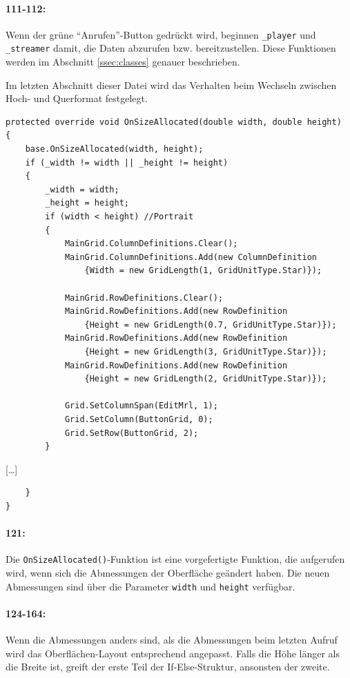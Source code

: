 \paragraph{111-112:} Wenn der grüne \enquote{Anrufen}-Button gedrückt wird, beginnen \texttt{\_player} und \texttt{\_streamer} damit, die Daten abzurufen bzw. bereitzustellen. Diese Funktionen werden im Abschnitt \ref{ssec:classes} genauer beschrieben.

Im letzten Abschnitt dieser Datei wird das Verhalten beim Wechseln zwischen Hoch- und Querformat festgelegt.
\begin{verbatim}
protected override void OnSizeAllocated(double width, double height)
{
    base.OnSizeAllocated(width, height);
    if (_width != width || _height != height)
    {
        _width = width;
        _height = height;
        if (width < height) //Portrait
        {
            MainGrid.ColumnDefinitions.Clear();
            MainGrid.ColumnDefinitions.Add(new ColumnDefinition
                {Width = new GridLength(1, GridUnitType.Star)});

            MainGrid.RowDefinitions.Clear();
            MainGrid.RowDefinitions.Add(new RowDefinition
                {Height = new GridLength(0.7, GridUnitType.Star)});
            MainGrid.RowDefinitions.Add(new RowDefinition
                {Height = new GridLength(3, GridUnitType.Star)});
            MainGrid.RowDefinitions.Add(new RowDefinition
                {Height = new GridLength(2, GridUnitType.Star)});

            Grid.SetColumnSpan(EditMrl, 1);
            Grid.SetColumn(ButtonGrid, 0);
            Grid.SetRow(ButtonGrid, 2);
        }
\end{verbatim}
[\dots]
\begin{verbatim}
    }
}
\end{verbatim}
\paragraph{121:} Die \texttt{OnSizeAllocated()}-Funktion ist eine vorgefertigte Funktion, die aufgerufen wird, wenn sich die Abmessungen der Oberfläche geändert haben.
Die neuen Abmessungen sind über die Parameter \texttt{width} und \texttt{height} verfügbar.
\paragraph{124-164:} Wenn die Abmessungen anders sind, als die Abmessungen beim letzten Aufruf wird das Oberflächen-Layout entsprechend angepasst.
Falls die Höhe länger als die Breite ist, greift der erste Teil der If-Else-Struktur, ansonsten der zweite.
